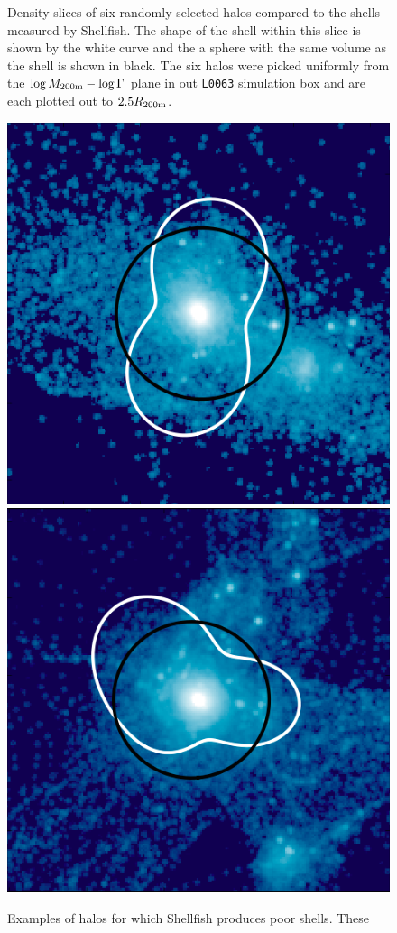 \documentclass[numberedappendix,apj]{emulateapj}
\begin{document}
\begin{figure}
   \caption{Density slices of six randomly selected halos compared to the
      shells measured by Shellfish. The shape of the shell within this slice
      is shown by the white curve and the a sphere with the same
      volume as the shell is shown in black. The six halos were picked uniformly
      from the $\log{M_{\rm 200m}}-\log{\Gamma}$ plane in out \texttt{L0063}
      simulation box and are each plotted out to $2.5 R_{\rm 200m}$.}
      \label{fig:pass_ex}
\end{figure}

\begin{figure}
   \centering
   \includegraphics[width=0.7\columnwidth]{example_halos/fail_ex1.png}
   \hspace{0.4cm}
   \includegraphics[width=0.7\columnwidth]{example_halos/fail_ex2.png}
   \caption{Examples of halos for which Shellfish produces poor shells. These
}
\end{figure}
\end{document}
